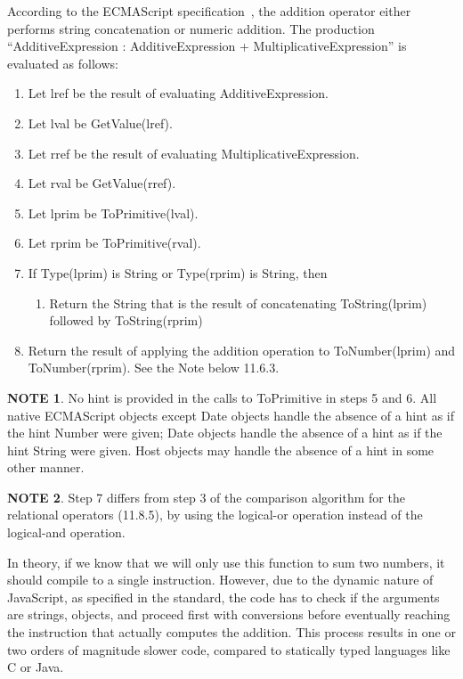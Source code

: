 

\begin{displayquote}
According to the ECMAScript specification~\cite{ecmascript},
the addition operator either performs string concatenation or numeric addition.
The production ``AdditiveExpression : AdditiveExpression + MultiplicativeExpression''
is evaluated as follows:

\begin{enumerate}
    \item Let lref be the result of evaluating AdditiveExpression.
    \item Let lval be GetValue(lref).
    \item Let rref be the result of evaluating MultiplicativeExpression.
    \item Let rval be GetValue(rref).
    \item Let lprim be ToPrimitive(lval).
    \item Let rprim be ToPrimitive(rval).
    \item If Type(lprim) is String or Type(rprim) is String, then
    \begin{enumerate}
        \item     Return the String that is the result of concatenating ToString(lprim) followed by ToString(rprim)
    \end{enumerate}
    \item Return the result of applying the addition operation to ToNumber(lprim) and ToNumber(rprim). See the Note below 11.6.3.
\end{enumerate}

\textbf{NOTE 1}. No hint is provided in the calls to ToPrimitive in steps 5 and 6. All native ECMAScript objects except Date objects handle the absence of a hint as if the hint Number were given; Date objects handle the absence of a hint as if the hint String were given. Host objects may handle the absence of a hint in some other manner.

\textbf{NOTE 2}. Step 7 differs from step 3 of the comparison algorithm for the relational operators (11.8.5), by using the logical-or operation instead of the logical-and operation.
\end{displayquote}


In theory, if we know that we will only use this function
to sum two numbers, it should compile to a single instruction.
However, due to the dynamic nature of JavaScript,
as specified in the standard, the code has to check if the arguments
are strings, objects, and proceed first with conversions before
eventually reaching the instruction that actually computes the addition.
This process results in one or two orders of magnitude slower code,
compared to statically typed languages like C or Java.

